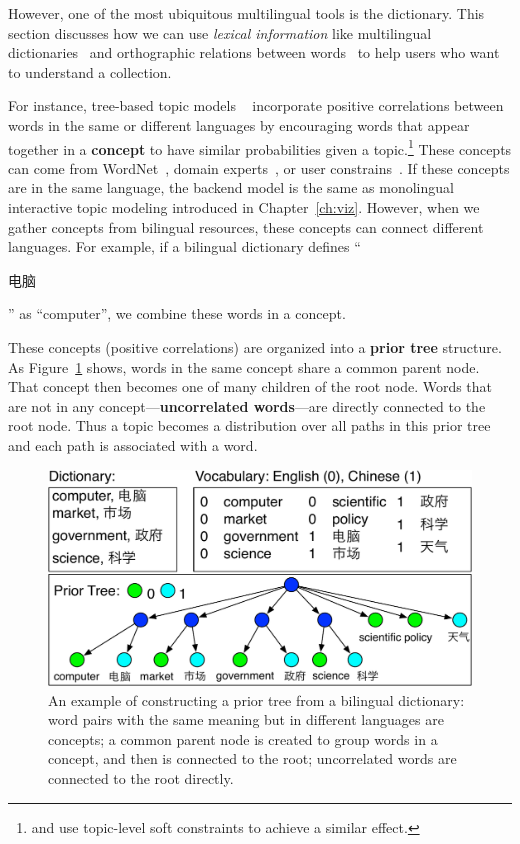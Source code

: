 However, one of the most ubiquitous multilingual tools is the
dictionary.  This section discusses how we can use \emph{lexical information} like
multilingual dictionaries~\citep{Zhang-10,boyd-graber-10} and orthographic relations 
between words~\citep{boyd-graber-09} to help users
who want to understand a collection.

For instance, tree-based topic models ~\citep{boyd-graber-07,andrzejewski-09,hu-14:itm}
incorporate positive correlations between words in the same or
different languages by encouraging words that appear together in a
{\bf concept} to have similar probabilities given a
topic.\footnote{\citet{boyd-graber-09} and \citet{Zhang-10} use
  topic-level soft constraints to achieve a similar effect.} These
concepts can come from WordNet~\citep{boyd-graber-10}, domain
experts~\citep{andrzejewski-09}, or user
constrains~\citep{hu-14:itm}. If these concepts are in the same
language, the backend model is the same as monolingual interactive topic modeling
introduced in Chapter~\ref{ch:viz}. However, when we gather concepts
from bilingual resources, these concepts can connect different
languages. For example, if a bilingual dictionary defines
``\begin{CJK*}{UTF8}{gbsn}电脑\end{CJK*}'' as ``computer'', we combine
  these words in a concept.

These concepts (positive correlations) are organized into a {\bf prior
  tree} structure. As Figure~\ref{fig:prior_trees} shows, words in the
same concept share a common parent node. That concept then becomes
one of many children of the root node.  Words that are not in any
concept---{\bf uncorrelated words}---are directly connected to the
root node. Thus a topic becomes a distribution over all paths in this
prior tree and each path is associated with a word.

\begin{figure}
\centering
\includegraphics[width=0.9\linewidth]{figures/correlations_tree-crop.pdf}
\vspace{-3mm}
\caption[Constructing prior tree from a bilingual dictionary]{An example of constructing a prior tree from a
  bilingual dictionary: word pairs with the same meaning but in
  different languages are concepts; a common parent node is created to
  group words in a concept, and then is connected to the root;
  uncorrelated words are connected to the root directly.}
\label{fig:prior_trees}
\end{figure}

